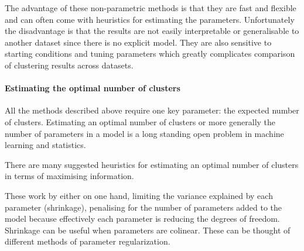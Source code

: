 The advantage of these non-parametric methods is that they are fast and flexible and can often come with heuristics for estimating the parameters.
Unfortunately the disadvantage is that the results are not easily interpretable or generalisable to another dataset since there is no explicit model.
They are also sensitive to starting conditions and tuning parameters which greatly complicates comparison of clustering results across datasets.


\paragraph{Estimating the optimal number of clusters}

All the methods described above require one key parameter: the expected number of clusters.
Estimating an optimal number of clusters or more generally the number of parameters in a model is a long standing open problem in machine learning and statistics.


There are many suggested heuristics for estimating an optimal number of clusters in terms of maximising information.

These work by either on one hand, limiting the variance explained by each parameter (shrinkage),
penalising for the number of parameters added to the model because
effectively each parameter is reducing the degrees of freedom.
Shrinkage can be useful when parameters are colinear.
These can be thought of different methods of parameter regularization.

